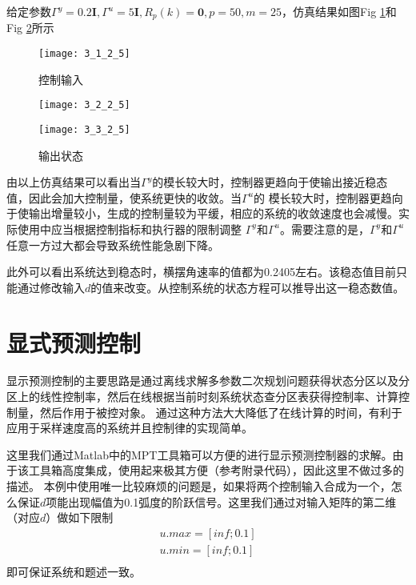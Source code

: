 \documentclass[UTF8]{article}
\begin{document}
给定参数$\Gamma^{y}=0.2\mathbf{I},\Gamma^{u}=5\mathbf{I},R_{p}(k)=\mathbf{0},p=50,m=25$，仿真结果如图Fig \ref{fig:1_5}和Fig \ref{fig:1_6}所示
\begin{figure}[htbp]
    \centering
    \texttt{[image: 3\_1\_2\_5]}
    \caption{控制输入}
    \label{fig:1_5}
\end{figure}
\begin{figure}[htbp]
    \setlength{\belowcaptionskip}{-0.45cm}
    
        \begin{minipage}{0.49\textwidth}
        \centering
    
        \texttt{[image: 3\_2\_2\_5]}    
        \end{minipage}
        \begin{minipage}{0.49\textwidth}
        \centering
        \texttt{[image: 3\_3\_2\_5]}    
        \end{minipage}
    \caption{输出状态}
    \label{fig:1_6}
\end{figure}

由以上仿真结果可以看出当$\Gamma^{y}$的模长较大时，控制器更趋向于使输出接近稳态值，因此会加大控制量，使系统更快的收敛。当$\Gamma^{u}$的
模长较大时，控制器更趋向于使输出增量较小，生成的控制量较为平缓，相应的系统的收敛速度也会减慢。实际使用中应当根据控制指标和执行器的限制调整
$\Gamma^{y}$和$\Gamma^{u}$。需要注意的是，$\Gamma^{y}$和$\Gamma^{u}$任意一方过大都会导致系统性能急剧下降。

此外可以看出系统达到稳态时，横摆角速率的值都为0.2405左右。该稳态值目前只能通过修改输入$d$的值来改变。从控制系统的状态方程可以推导出这一稳态数值。
\newpage
\section{显式预测控制}
显示预测控制的主要思路是通过离线求解多参数二次规划问题获得状态分区以及分区上的线性控制率，然后在线根据当前时刻系统状态查分区表获得控制率、计算控制量，然后作用于被控对象。
通过这种方法大大降低了在线计算的时间，有利于应用于采样速度高的系统并且控制律的实现简单。

这里我们通过Matlab中的MPT工具箱可以方便的进行显示预测控制器的求解。由于该工具箱高度集成，使用起来极其方便（参考附录代码），因此这里不做过多的描述。
本例中使用唯一比较麻烦的问题是，如果将两个控制输入合成为一个，怎么保证$d$项能出现幅值为0.1弧度的阶跃信号。这里我们通过对输入矩阵的第二维（对应$d$）做如下限制
\[
    \begin{array}{c}
        u.max = [inf;0.1]\\
        u.min = [inf;0.1]\\
    \end{array}
\]
即可保证系统和题述一致。
\end{document}
